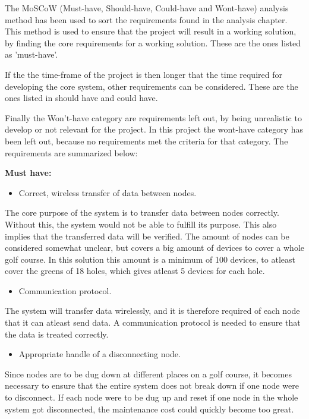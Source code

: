 The MoSCoW (Must-have, Should-have, Could-have and Wont-have) analysis method has been used to sort the requirements found in the analysis chapter. This method is used to ensure that the project will result in a working solution, by finding the core requirements for a working solution. These are the ones listed as 'must-have'.

If the the time-frame of the project is then longer that the time required for developing the core system, other requirements can be considered. These are the ones listed in should have and could have. 

Finally the Won't-have category are requirements left out, by being unrealistic to develop or not relevant for the project. In this project the wont-have category has been left out, because no requirements met the criteria for that category. The requirements are summarized below:

\textbf{Must have:}
\begin{itemize}
\item Correct, wireless transfer of data between nodes.
\end{itemize}
The core purpose of the system is to transfer data between nodes correctly. Without this, the system would not be able to fulfill its purpose. This also implies that the transferred data will be verified. The amount of nodes can be considered somewhat unclear, but covers a big amount of devices to cover a whole golf course. In this solution this amount is a minimum of 100 devices, to atleast cover the greens of 18 holes, which gives atleast 5 devices for each hole. 


\begin{itemize}
\item Communication protocol.
\end{itemize}
The system will transfer data wirelessly, and it is therefore required of each node that it can atleast send data. A communication protocol is needed to ensure that the data is treated correctly.


\begin{itemize}
\item Appropriate handle of a disconnecting node.
\end{itemize}
Since nodes are to be dug down at different places on a golf course, it becomes necessary to ensure that the entire system does not break down if one node were to disconnect. If each node were to be dug up and reset if one node in the whole system got disconnected, the maintenance cost could quickly become too great.


